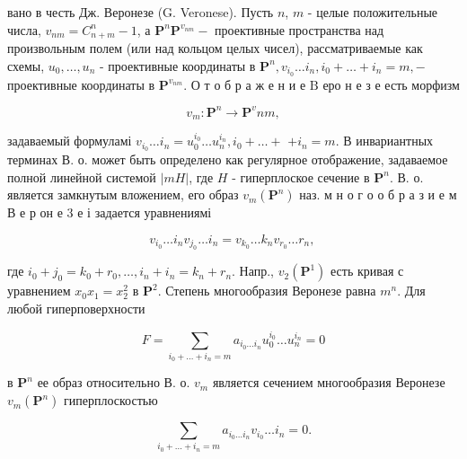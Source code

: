 \documentclass[10pt]{article}
\begin{document}
вано в честь Дж. Веронезе (G. Veronese). Пусть $n$, $m$ - целые положительные числа, $v_{n m}=C_{n+m}^{n}-1$, а $\boldsymbol{P}^{n} \boldsymbol{P}^{v_{n m}}-$ проективные пространства над произвольным полем (или над кольцом целых чисел), рассматриваемые как схемы, $u_{0}, \ldots, u_{n}$ - проективные координаты в $\boldsymbol{P}^{n}, v_{i_{0}} \ldots i_{n}, i_{0}+\ldots+i_{n}=m,-$ проективные координаты в $\boldsymbol{P}^{v_{n m}}$. О т о б р а ж е н и е $\mathrm{B}$ еро н е з е есть морфизм



\[

v_{m}: \boldsymbol{P}^{n} \longrightarrow \boldsymbol{P}^{v} n m,

\]



задаваемый формуламі $v_{i_{0}} \ldots i_{n}=u_{0}^{i_{0}} \ldots u_{n}^{i_{n}}, i_{0}+\ldots+$ $+i_{n}=m$. В инвариантных терминах В. о. может быть определено как регулярное отображение, задаваемое полной линейной системой $|m H|$, где $H$ - гиперплоское сечение в $\boldsymbol{P}^{n}$. В. о. является замкнутым вложением, его образ $v_{m}\left(\boldsymbol{P}^{n}\right)$ наз. м н о г о о б р а з и е м В е р он е 3 е і задается уравнениямі



\[

v_{i_{0}} \ldots i_{n} v_{j_{0}} \ldots i_{n}=v_{k_{0}} \ldots k_{n} v_{r_{0}} \ldots r_{n} \text {, }

\]



где $i_{0}+j_{0}=k_{0}+r_{0}, \ldots, i_{n}+i_{n}=k_{n}+r_{n}$. Напр., $v_{2}\left(\boldsymbol{P}^{1}\right)$ есть кривая с уравнением $x_{0} x_{1}=x_{2}^{2}$ в $\boldsymbol{P}^{2}$. Степень многообразия Веронезе равна $m^{n}$. Для любой гиперповерхности



\[

F=\sum_{i_{0}+\ldots+i_{n}=m} a_{i_{0} \ldots i_{n}} u_{0}^{i_{0}} \ldots u_{n}^{i_{n}}=0

\]



в $\boldsymbol{P}^{n}$ ее образ относительно В. о. $v_{m}$ является сечением многообразия Веронезе $v_{m}\left(\boldsymbol{P}^{n}\right)$ гиперплоскостью



\[

\sum_{i_{0}+\ldots+i_{n}=m} a_{i_{0} \ldots i_{n}} v_{i_{0}} \ldots i_{n}=0 .

\]
\end{document}
